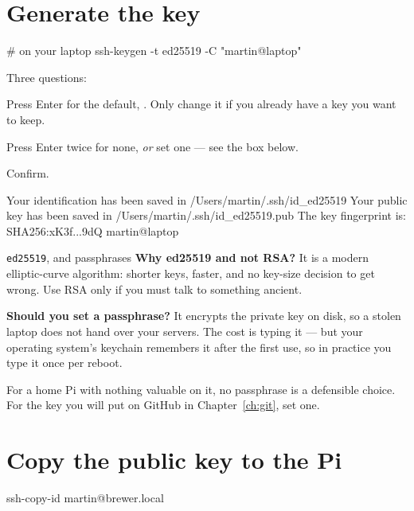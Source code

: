 \section{Generate the key}

\begin{shell}
# on your laptop
ssh-keygen -t ed25519 -C "martin@laptop"
\end{shell}

Three questions:

\begin{description}[leftmargin=0pt, style=nextline]
  \item[File to save the key] Press Enter for the default,
        . Only change it if you already
        have a key you want to keep.
  \item[Passphrase] Press Enter twice for none, \emph{or} set one --- see the
        box below.
  \item[Same again] Confirm.
\end{description}

\begin{trace}
Your identification has been saved in /Users/martin/.ssh/id_ed25519
Your public key has been saved in /Users/martin/.ssh/id_ed25519.pub
The key fingerprint is:
SHA256:xK3f...9dQ martin@laptop
\end{trace}

\begin{concept}{\texttt{ed25519}, and passphrases}
\textbf{Why ed25519 and not RSA?} It is a modern elliptic-curve algorithm:
shorter keys, faster, and no key-size decision to get wrong. Use RSA only if you
must talk to something ancient.

\textbf{Should you set a passphrase?} It encrypts the private key on disk, so a
stolen laptop does not hand over your servers. The cost is typing it --- but your
operating system's keychain remembers it after the first use, so in practice you
type it once per reboot.

For a home Pi with nothing valuable on it, no passphrase is a defensible choice.
For the key you will put on GitHub in Chapter~\ref{ch:git}, set one.
\end{concept}

\section{Copy the public key to the Pi}

\begin{shell}
ssh-copy-id martin@brewer.local
\end{shell}


